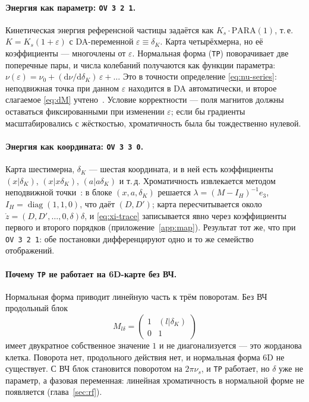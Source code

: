 \paragraph{Энергия как параметр: \texttt{OV 3 2 1}.}
Кинетическая энергия референсной частицы задаётся как $K_s\cdot\mathrm{PARA}(1)$, т.\,е. $K=K_s(1+\varepsilon)$ с DA-переменной $\varepsilon\equiv\delta_K$. Карта четырёхмерна, но её коэффициенты --- многочлены от $\varepsilon$. Нормальная форма (\texttt{TP}) поворачивает две поперечные пары, и числа колебаний получаются как функции параметра: $\nu(\varepsilon)=\nu_0+(\mathrm{d}\nu/\mathrm{d}\delta_K)\,\varepsilon+\dots$ Это в точности определение \eqref{eq:nu-series}: неподвижная точка при данном $\varepsilon$ находится в DA автоматически, и второе слагаемое \eqref{eq:dM} учтено~\cite{ValetovPhD}. Условие корректности --- поля магнитов должны оставаться фиксированными при изменении $\varepsilon$; если бы градиенты масштабировались с жёсткостью, хроматичность была бы тождественно нулевой.

\paragraph{Энергия как координата: \texttt{OV 3 3 0}.}
Карта шестимерна, $\delta_K$ --- шестая координата, и в ней есть коэффициенты $(x|\delta_K)$, $(x|x\delta_K)$, $(a|a\delta_K)$ и т.\,д. Хроматичность извлекается методом неподвижной точки~\cite{ValetovPhD}: в блоке $(x,a,\delta_K)$ решается $\lambda=(M-I_H)^{-1}e_3$, $I_H=\operatorname{diag}(1,1,0)$, что даёт $(D,D')$; карта пересчитывается около $\mathring z=(D,D',\dots,0,\delta)\delta$, и \eqref{eq:xi-trace} записывается явно через коэффициенты первого и второго порядков (приложение~\ref{app:map}). Результат тот же, что при \texttt{OV 3 2 1}: обе постановки дифференцируют одно и то же семейство отображений.

\paragraph{Почему \texttt{TP} не работает на 6D-карте без ВЧ.}
Нормальная форма приводит линейную часть к трём поворотам. Без ВЧ продольный блок
\begin{equation}
\label{eq:jordan}
M_{l\delta}=\begin{pmatrix}1&(l|\delta_K)\\0&1\end{pmatrix}
\end{equation}
имеет двукратное собственное значение $1$ и не диагонализуется --- это жорданова клетка. Поворота нет, продольного действия нет, и нормальная форма 6D не существует. С ВЧ блок становится поворотом на $2\pi\nu_s$, и \texttt{TP} работает, но $\delta$ уже не параметр, а фазовая переменная: линейная хроматичность в нормальной форме не появляется (глава~\ref{sec:rf}).

